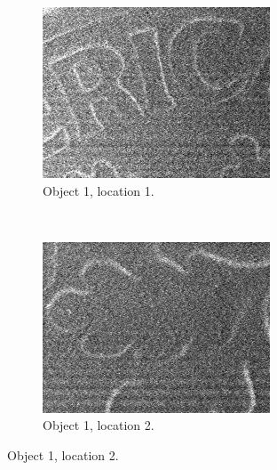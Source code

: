 \documentclass[10pt]{IEEEtran}
\begin{document}
\begin{center}
\begin{figure}[!t]
    \begin{subfigure}[!t]{0.25\textwidth}
        \includegraphics[width=\textwidth]{Dime_1}
        \caption{Object 1, location 1.}
        \label{fig:Dime_1}
    \end{subfigure}\quad
    ~ %
    \begin{subfigure}[!t]{0.25\textwidth}
        \includegraphics[width=\textwidth]{Dime_2}
        \caption{Object 1, location 2.}
        \label{fig:Dime_2}
    \end{subfigure}\hfill

\end{figure}
\end{center}
\end{document}
